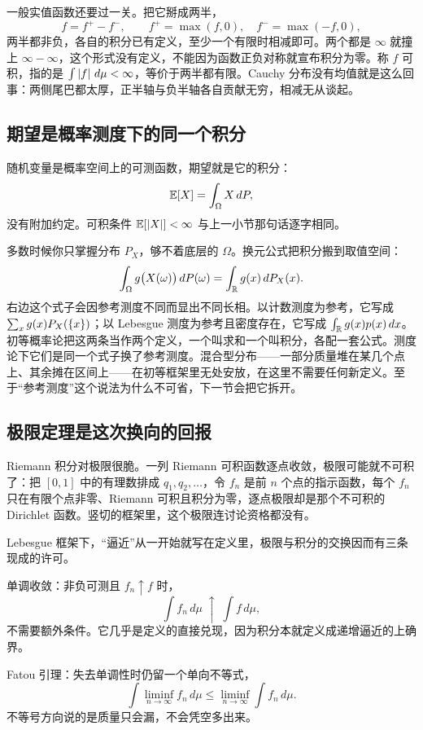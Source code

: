 一般实值函数还要过一关。把它掰成两半，
\[
f=f^{+}-f^{-},\qquad f^{+}=\max(f,0),\quad f^{-}=\max(-f,0),
\]
两半都非负，各自的积分已有定义，至少一个有限时相减即可。两个都是 \(\infty\) 就撞上 \(\infty-\infty\)，这个形式没有定义，不能因为函数正负对称就宣布积分为零。称 \(f\) 可积，指的是 \(\int\left|f\right|\,d\mu<\infty\)，等价于两半都有限。Cauchy 分布没有均值就是这么回事：两侧尾巴都太厚，正半轴与负半轴各自贡献无穷，相减无从谈起。

\subsection{期望是概率测度下的同一个积分}

随机变量是概率空间上的可测函数，期望就是它的积分：
\[
\mathbb{E}[X]=\int_\Omega X\,dP,
\]
没有附加约定。可积条件 \(\mathbb{E}[\left|X\right|]<\infty\) 与上一小节那句话逐字相同。

多数时候你只掌握分布 \(P_X\)，够不着底层的 \(\Omega\)。换元公式把积分搬到取值空间：
\[
\int_\Omega g\bigl(X(\omega)\bigr)\,dP(\omega)=\int_{\mathbb{R}}g(x)\,dP_X(x).
\]
右边这个式子会因参考测度不同而显出不同长相。以计数测度为参考，它写成 \(\sum_x g(x)P_X(\left\{x\right\})\)；以 Lebesgue 测度为参考且密度存在，它写成 \(\int_{\mathbb{R}} g(x)p(x)\,dx\)。初等概率论把这两条当作两个定义，一个叫求和一个叫积分，各配一套公式。测度论下它们是同一个式子换了参考测度。混合型分布——一部分质量堆在某几个点上、其余摊在区间上——在初等框架里无处安放，在这里不需要任何新定义。至于``参考测度''这个说法为什么不可省，下一节会把它拆开。

\subsection{极限定理是这次换向的回报}

Riemann 积分对极限很脆。一列 Riemann 可积函数逐点收敛，极限可能就不可积了：把 \([0,1]\) 中的有理数排成 \(q_1,q_2,\ldots\)，令 \(f_n\) 是前 \(n\) 个点的指示函数，每个 \(f_n\) 只在有限个点非零、Riemann 可积且积分为零，逐点极限却是那个不可积的 Dirichlet 函数。竖切的框架里，这个极限连讨论资格都没有。

Lebesgue 框架下，``逼近''从一开始就写在定义里，极限与积分的交换因而有三条现成的许可。

单调收敛：非负可测且 \(f_n\uparrow f\) 时，
\[
\int f_n\,d\mu\;\uparrow\;\int f\,d\mu,
\]
不需要额外条件。它几乎是定义的直接兑现，因为积分本就定义成递增逼近的上确界。

Fatou 引理：失去单调性时仍留一个单向不等式，
\[
\int \liminf_{n\to\infty}f_n\,d\mu\le\liminf_{n\to\infty}\int f_n\,d\mu.
\]
不等号方向说的是质量只会漏，不会凭空多出来。


